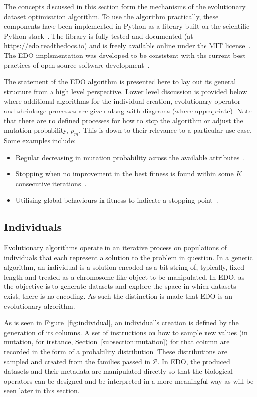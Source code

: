 The concepts discussed in this section form the mechanisms of the evolutionary
dataset optimisation algorithm. To use the algorithm practically, these
components have been implemented in Python as a library built on the scientific
Python stack~\cite{pandas,numpy}. The library is fully tested and documented (at
\url{https://edo.readthedocs.io}) and is freely available online under the MIT
license~\cite{edo-project}. The EDO implementation was developed to be
consistent with the current best practices of open source software
development~\cite{Jimenez2017}.


The statement of the EDO algorithm is presented here to lay out its general
structure from a high level perspective. Lower level discussion is provided
below where additional algorithms for the individual creation, evolutionary
operator and shrinkage processes are given along with diagrams (where
appropriate). Note that there are no defined processes for how to stop the
algorithm or adjust the mutation probability, \(p_m\). This is down to their
relevance to a particular use case. Some examples include:
\begin{itemize}
    \item Regular decreasing in mutation probability across the available
        attributes~\cite{Kuehn2013}.
    \item Stopping when no improvement in the best fitness is found within some
        \(K\) consecutive iterations~\cite{Leung2001}.
    \item Utilising global behaviours in fitness to indicate a stopping
        point~\cite{Marti2016}.
\end{itemize}

\subsection{Individuals}

Evolutionary algorithms operate in an iterative process on populations of
individuals that each represent a solution to the problem in question. In a
genetic algorithm, an individual is a solution encoded as a bit string of,
typically, fixed length and treated as a chromosome-like object to be
manipulated. In EDO, as the objective is to generate datasets and explore the
space in which datasets exist, there is no encoding. As such the distinction is
made that EDO is an evolutionary algorithm.

As is seen in Figure~\ref{fig:individual}, an individual's creation is
defined by the generation of its columns. A set of instructions on how to sample
new values (in mutation, for instance, Section~\ref{subsection:mutation}) for
that column are recorded in the form of a probability distribution. These
distributions are sampled and created from the families passed in
\(\mathcal{P}\). In EDO, the produced datasets and their metadata are
manipulated directly so that the biological operators can be designed and be
interpreted in a more meaningful way as will be seen later in this section.

